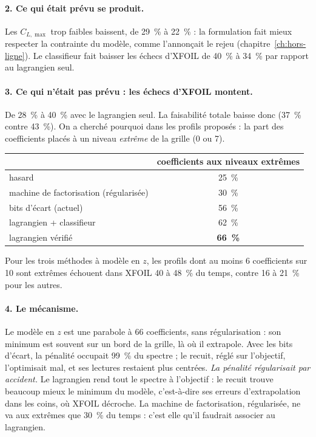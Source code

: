 \paragraph{2. Ce qui était prévu se produit.} Les $C_{L,\max}$ trop faibles baissent, de 29~\% à 22~\% : la formulation fait mieux respecter la contrainte du modèle, comme l'annonçait le rejeu (chapitre~\ref{ch:hors-ligne}). Le classifieur fait baisser les échecs d'XFOIL de 40~\% à 34~\% par rapport au lagrangien seul.

\paragraph{3. Ce qui n'était pas prévu : les échecs d'XFOIL montent.} De 28~\% à 40~\% avec le lagrangien seul. La faisabilité totale baisse donc (37~\% contre 43~\%). On a cherché pourquoi dans les profils proposés : la part des coefficients placés à un niveau \emph{extrême} de la grille (0 ou 7).
\begin{center}
\begin{tabular}{lc}
\toprule
& coefficients aux niveaux extrêmes \\
\midrule
hasard & 25~\% \\
machine de factorisation (régularisée) & 30~\% \\
bits d'écart (actuel) & 56~\% \\
lagrangien + classifieur & 62~\% \\
lagrangien vérifié & \textbf{66~\%} \\
\bottomrule
\end{tabular}
\end{center}
Pour les trois méthodes à modèle en $z$, les profils dont au moins 6 coefficients sur 10 sont extrêmes échouent dans XFOIL 40 à 48~\% du temps, contre 16 à 21~\% pour les autres.

\paragraph{4. Le mécanisme.} Le modèle en $z$ est une parabole à 66 coefficients, sans régularisation : son minimum est souvent sur un bord de la grille, là où il extrapole. Avec les bits d'écart, la pénalité occupait 99~\% du spectre ; le recuit, réglé sur l'objectif, l'optimisait mal, et ses lectures restaient plus centrées. \emph{La pénalité régularisait par accident.} Le lagrangien rend tout le spectre à l'objectif : le recuit trouve beaucoup mieux le minimum du modèle, c'est-à-dire ses erreurs d'extrapolation dans les coins, où XFOIL décroche. La machine de factorisation, régularisée, ne va aux extrêmes que 30~\% du temps : c'est elle qu'il faudrait associer au lagrangien.

